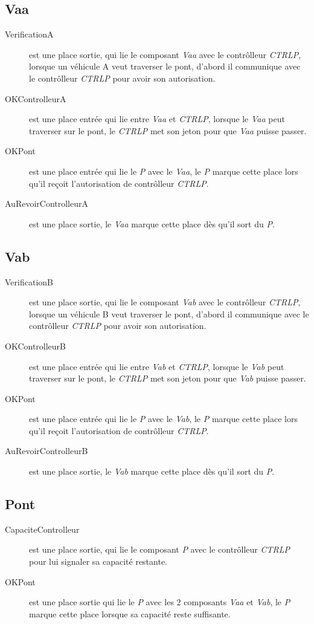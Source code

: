 \documentclass[a4paper,11pt]{report}
\begin{document}
\subsection{Vaa}
	\begin{description}
		\item[VerificationA] est une place sortie, qui lie le composant \textit{Vaa} avec le contrôlleur \textit{CTRLP}, lorsque un véhicule A veut traverser le pont, d'abord il communique avec le contrôlleur \textit{CTRLP} pour avoir son autorisation.
		\item[OKControlleurA] est une place entrée qui lie entre \textit{Vaa} et \textit{CTRLP}, lorsque le \textit{Vaa} peut traverser sur le pont, le \textit{CTRLP} met son jeton pour que \textit{Vaa} puisse passer.
		\item[OKPont] est une place entrée qui lie le \textit{P} avec le \textit{Vaa}, le \textit{P} marque cette place lors qu'il reçoit l'autorisation de contrôlleur \textit{CTRLP}.
		\item[AuRevoirControlleurA] est une place sortie, le \textit{Vaa} marque cette place dès qu'il sort du \textit{P}.
	\end{description}	
	
	\subsection{Vab}
	\begin{description}
		\item[VerificationB] est une place sortie, qui lie le composant \textit{Vab} avec le contrôlleur \textit{CTRLP}, lorsque un véhicule B veut traverser le pont, d'abord il communique avec le contrôlleur \textit{CTRLP} pour avoir son autorisation.
		\item[OKControlleurB] est une place entrée qui lie entre \textit{Vab} et \textit{CTRLP}, lorsque le \textit{Vab} peut traverser sur le pont, le \textit{CTRLP} met son jeton pour que \textit{Vab} puisse passer.
		\item[OKPont] est une place entrée qui lie le \textit{P} avec le \textit{Vab}, le \textit{P} marque cette place lors qu'il reçoit l'autorisation de contrôlleur \textit{CTRLP}.
		\item[AuRevoirControlleurB] est une place sortie, le \textit{Vab} marque cette place dès qu'il sort du \textit{P}.
	\end{description}	
	
	\subsection{Pont}
	\begin{description}
		\item[CapaciteControlleur] est une place sortie, qui lie le composant \textit{P} avec le contrôlleur \textit{CTRLP} pour lui signaler sa capacité restante.
		\item[OKPont] est une place sortie qui lie le \textit{P} avec les 2 composants \textit{Vaa} et \textit{Vab}, le \textit{P} marque cette place lorsque sa capacité reste suffisante.
	\end{description}	
	
\end{document}
